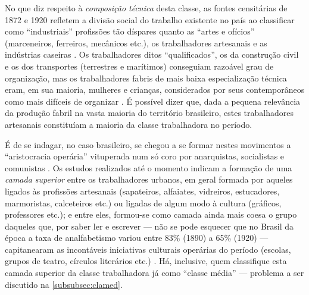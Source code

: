 No que diz respeito à \textit{composição técnica} desta classe, as fontes censitárias de 1872 e 1920 refletem a divisão social do trabalho existente no país ao classificar como ``industriais'' profissões tão díspares quanto as ``artes e ofícios'' (marceneiros, ferreiros, mecânicos etc.), os trabalhadores artesanais e as indústrias caseiras \cite[p.~141]{pinheiro_prolind_1977}. Os trabalhadores ditos ``qualificados'', os da construção civil e os dos transportes (terrestres e marítimos) conseguiam razoável grau de organização, mas os trabalhadores fabris de mais baixa especialização técnica eram, em sua maioria, mulheres e crianças, considerados por seus contemporâneos como mais difíceis de organizar \cite[p.~152]{pinheiro_prolind_1977}. É possível dizer que, dada a pequena relevância da produção fabril na vasta maioria do território brasileiro, estes trabalhadores artesanais constituíam a maioria da classe trabalhadora no período.

É de se indagar, no caso brasileiro, se chegou a se formar nestes movimentos a ``aristocracia operária'' vituperada num só coro por anarquistas, socialistas e comunistas \cite{bakunin_contramarx_2015,engels_1892pref_1990,lenin_imperialismo_1987}. Os estudos realizados até o momento indicam a formação de uma \textit{camada superior} entre os trabalhadores urbanos, em geral formada por aqueles ligados às profissões artesanais (sapateiros, alfaiates, vidreiros, estucadores, marmoristas, calceteiros etc.) ou ligadas de algum modo à cultura (gráficos, professores etc.); e entre eles, formou-se como camada ainda mais coesa o grupo daqueles que, por saber ler e escrever --- não se pode esquecer que no Brasil da época a taxa de analfabetismo variou entre 83\% (1890) a 65\% (1920) --- capitanearam as incontáveis iniciativas culturais operárias do período (escolas, grupos de teatro, círculos literários etc.) \cite{gomes_velhos_1988,goes_formacao_1988,hardman_patripatr_2002,pinheiro_prolind_1977}. Há, inclusive, quem classifique esta camada superior da classe trabalhadora já como ``classe média'' --- problema a ser discutido na \autoref{subsubsec:clamed}.

